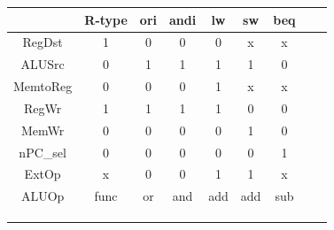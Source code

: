 \documentclass[letterpaper,11pt,notitlepage]{article}
\begin{document}
\begin{table}[H]
\begin{center}
\begin{tabular}{|c|c|c|c|c|c|c|c|c|} \hline
            & R-type  & ori & andi & lw & sw & beq \\ \hline
RegDst      & 1       & 0   &0     & 0  & x  & x    \\ \hline
ALUSrc      & 0       & 1   &1     & 1  & 1  & 0    \\ \hline
MemtoReg    & 0       & 0   &0     & 1  & x  & x    \\ \hline
RegWr       & 1       & 1   &1     & 1  & 0  & 0    \\ \hline
MemWr       & 0       & 0   &0     & 0  & 1  & 0    \\ \hline
nPC\_sel     & 0       & 0   &0     & 0  & 0  & 1   \\ \hline
ExtOp       & x       & 0   &0     & 1  & 1  & x    \\ \hline
ALUOp       & func    & or  &and   & add& add& sub \\ \hline
  &        &    &    &   &   &    \\ \hline
  &        &    &    &   &   &    \\ \hline
   &        &    &    &   &   &    \\ \hline
\end{tabular}
\end{center}
\end{table}

\newpage
\end{document}
